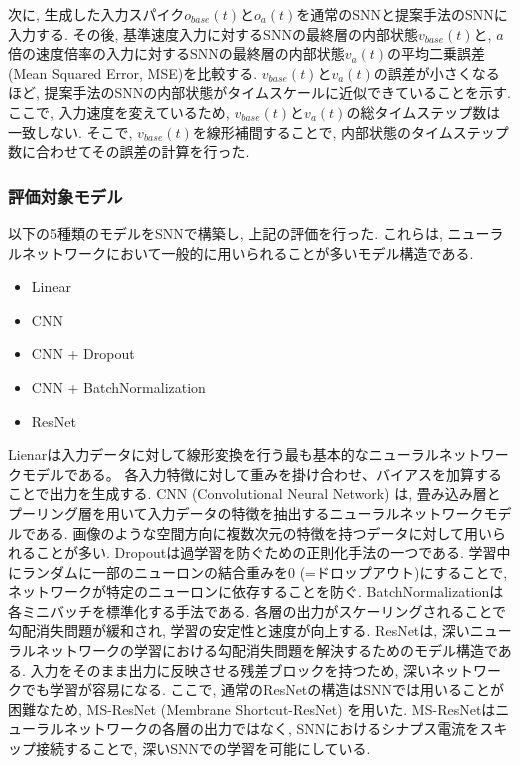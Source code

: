 次に, 生成した入力スパイク$o_{base}(t)$と$o_a(t)$を通常のSNNと提案手法のSNNに入力する.
その後, 基準速度入力に対するSNNの最終層の内部状態$v_{base}(t)$と, $a$倍の速度倍率の入力に対するSNNの最終層の内部状態$v_a(t)$の平均二乗誤差 (Mean Squared Error, MSE)を比較する.
$v_{base}(t)$と$v_a(t)$の誤差が小さくなるほど, 提案手法のSNNの内部状態がタイムスケールに近似できていることを示す.
ここで, 入力速度を変えているため, $v_{base}(t)$と$v_a(t)$の総タイムステップ数は一致しない.
そこで, $v_{base}(t)$を線形補間することで, 内部状態のタイムステップ数に合わせてその誤差の計算を行った.

\subsubsection{評価対象モデル}
以下の5種類のモデルをSNNで構築し, 上記の評価を行った.
これらは, ニューラルネットワークにおいて一般的に用いられることが多いモデル構造である.
\begin{itemize}
    \item Linear
    \item CNN\cite{cnn}
    \item CNN + Dropout\cite{dropout}
    \item CNN + BatchNormalization\cite{batchnorm}
    \item ResNet\cite{resnet}
\end{itemize}
Lienarは入力データに対して線形変換を行う最も基本的なニューラルネットワークモデルである。
各入力特徴に対して重みを掛け合わせ、バイアスを加算することで出力を生成する.
CNN (Convolutional Neural Network) は, 畳み込み層とプーリング層を用いて入力データの特徴を抽出するニューラルネットワークモデルである.
画像のような空間方向に複数次元の特徴を持つデータに対して用いられることが多い.
Dropoutは過学習を防ぐための正則化手法の一つである.
学習中にランダムに一部のニューロンの結合重みを0 (=ドロップアウト)にすることで, ネットワークが特定のニューロンに依存することを防ぐ.
BatchNormalizationは各ミニバッチを標準化する手法である.
各層の出力がスケーリングされることで勾配消失問題が緩和され, 学習の安定性と速度が向上する.
ResNetは, 深いニューラルネットワークの学習における勾配消失問題を解決するためのモデル構造である.
入力をそのまま出力に反映させる残差ブロックを持つため, 深いネットワークでも学習が容易になる.
ここで, 通常のResNetの構造はSNNでは用いることが困難なため, MS-ResNet (Membrane Shortcut-ResNet)\cite{msresnet} を用いた.
MS-ResNetはニューラルネットワークの各層の出力ではなく, SNNにおけるシナプス電流をスキップ接続することで, 深いSNNでの学習を可能にしている.

